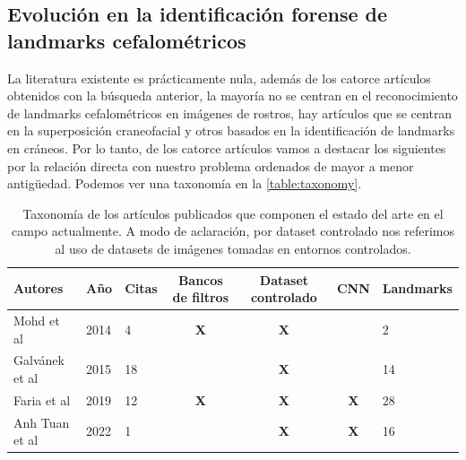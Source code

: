         

        \subsection{Evolución en la identificación forense de landmarks cefalométricos}
            
            \noindent La literatura existente es prácticamente nula, además de los catorce artículos obtenidos con la búsqueda anterior, la mayoría no se centran en el reconocimiento de landmarks cefalométricos en imágenes de rostros, hay artículos que se centran en la superposición craneofacial y otros basados en la identificación de landmarks en cráneos. Por lo tanto, de los catorce artículos vamos a destacar los siguientes por la relación directa con nuestro problema ordenados de mayor a menor antigüedad. Podemos ver una taxonomía en la \autoref{table:taxonomy}. 

            \begin{table}[!ht]
                \centering
                \caption{Taxonomía de los artículos publicados que componen el estado del arte en el campo actualmente. A modo de aclaración, por dataset controlado nos referimos al uso de datasets de imágenes tomadas en entornos controlados.}
                \begin{tabular}{|l|l|l|c|c|c|l|}
                \hline
                    \cellcolor{gray!50}\textbf{Autores} & \cellcolor{gray!50}\textbf{Año} & \cellcolor{gray!50}\textbf{Citas} & \cellcolor{gray!50}\textbf{Bancos de filtros} & \cellcolor{gray!50}\textbf{Dataset controlado} & \cellcolor{gray!50}\textbf{CNN} & \cellcolor{gray!50}\textbf{Landmarks}\\ \hline
                    Mohd et al & 2014 & 4 & \cellcolor{gray!15} \textbf{X} & \cellcolor{gray!15} \textbf{X} & ~ & 2 \\ \hline
                    Galvánek et al & 2015 & 18 & ~ & \cellcolor{gray!15} \textbf{X} & ~ & 14 \\ \hline
                    Faria et al & 2019 & 12 & \cellcolor{gray!15}\textbf{X} & \cellcolor{gray!15}\textbf{X}& \cellcolor{gray!15}\textbf{X} & 28 \\ \hline
                    Anh Tuan et al & 2022 & 1 & ~ & \cellcolor{gray!15}\textbf{X} & \cellcolor{gray!15}\textbf{X}& 16 \\ \hline
                \end{tabular}
                \label{table:taxonomy}
            \end{table}

